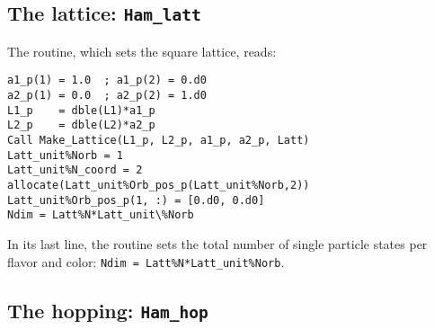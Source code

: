 \subsection{The lattice: \texttt{Ham\_latt}} \label{U_PV_Ham_latt}

The routine, which sets the square lattice, reads:
\begin{lstlisting}[style=fortran]
a1_p(1) = 1.0  ; a1_p(2) = 0.d0
a2_p(1) = 0.0  ; a2_p(2) = 1.d0
L1_p    = dble(L1)*a1_p
L2_p    = dble(L2)*a2_p
Call Make_Lattice(L1_p, L2_p, a1_p, a2_p, Latt)
Latt_unit%Norb = 1
Latt_unit%N_coord = 2
allocate(Latt_unit%Orb_pos_p(Latt_unit%Norb,2))
Latt_unit%Orb_pos_p(1, :) = [0.d0, 0.d0]
Ndim = Latt%N*Latt_unit\%Norb

\end{lstlisting}
In its last line, the routine sets the total number of single particle states per flavor and color:
\texttt{Ndim = Latt\%N*Latt\_unit\%Norb}.

\subsection{The hopping: \texttt{Ham\_hop}} \label{U_PV_Ham_hop}

